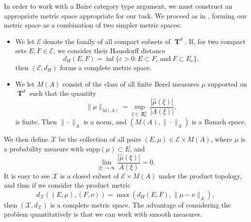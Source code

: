 \documentclass[12pt,reqno]{article}
\numberwithin{equation}{section}
\DeclareMathOperator{\ZZ}{\mathbf{Z}}
\DeclareMathOperator{\TT}{\mathbf{T}}
\begin{document}
In order to work with a Baire category type argument, we must construct an appropriate metric space appropriate for our task. We proceed as in \cite{Korner2}, forming our metric space as a combination of two simpler metric spaces:
%
\begin{itemize}
    \item We let $\mathcal{E}$ denote the family of all compact subsets of $\TT^d$. If, for two compact sets $E,F \in \mathcal{E}$, we consider their Hausdorff distance
    \[ d_H(E,F) = \inf \{ \varepsilon > 0 : E \subset F_\varepsilon\ \text{and}\ F \subset E_\varepsilon \}, \]
    then $(\mathcal{E},d_H)$ forms a complete metric space.

    \item We let $M(A)$ consist of the class of all finite Borel measures $\mu$ supported on $\TT^d$ such that the quantity
    \[ \| \mu \|_{M(A)} =  \sup_{\xi \in \ZZ^d_0} \frac{|\widehat{\mu}(\xi)|}{|A(\xi)|}, \]
    is finite. Then $\| \cdot \|_A$ is a norm, and $(M(A), \| \cdot \|_A)$ is a Banach space.
\end{itemize}
%
We then define $\mathcal{X}$ be the collection of all pairs $(E,\mu) \in \mathcal{E} \times M(A)$, where $\mu$ is a probability measure with $\text{supp}(\mu) \subset E$, and
%
\[ \lim_{|\xi| \to \infty} \frac{|\widehat{\mu}(\xi)|}{A(\xi)} = 0. \]
%
It is easy to see $\mathcal{X}$ is a closed subset of $\mathcal{E} \times M(A)$ under the product topology, and thus if we consider the product metric
%
\[ d_{\mathcal{X}}((E,\mu),(F,\nu)) = \max \left( d_H(E,F), \| \mu - \nu \|_A \right), \]
%
then $(\mathcal{X},d_\mathcal{X})$ is a complete metric space. The advantage of considering the problem quantitatively is that we can work with smooth measures.
\end{document}
